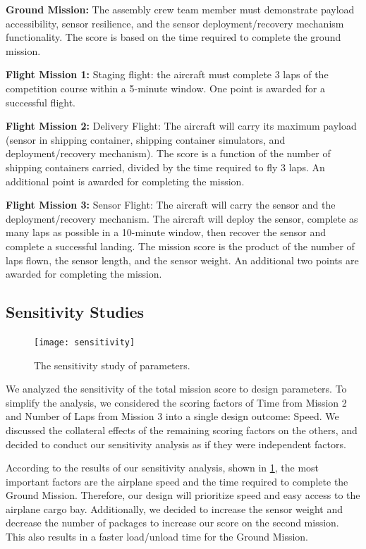 \documentclass[proposal]{byu-aero}
\begin{document}
\noindent \textbf{Ground Mission:} The assembly crew team member must demonstrate payload accessibility, sensor resilience, and the sensor deployment/recovery mechanism functionality. The score is based on the time required to complete the ground mission. 

\noindent \textbf{Flight Mission 1:} Staging flight: the aircraft must complete 3 laps of the competition course within a 5-minute window. One point is awarded for a successful flight. 

\noindent \textbf{Flight Mission 2:} Delivery Flight: The aircraft will carry its maximum payload (sensor in shipping container, shipping container simulators, and deployment/recovery mechanism). The score is a function of the number of shipping containers carried, divided by the time required to fly 3 laps. An additional point is awarded for completing the mission. 

\noindent \textbf{Flight Mission 3:} Sensor Flight: The aircraft will carry the sensor and the deployment/recovery mechanism. The aircraft will deploy the sensor, complete as many laps as possible in a 10-minute window, then recover the sensor and complete a successful landing. The mission score is the product of the number of laps flown, the sensor length, and the sensor weight. An additional two points are awarded for completing the mission.

\subsection{Sensitivity Studies}
\label{ssec:sensitivitystudies}

\begin{figure}
	\centering
	\vspace*{-10pt}
	\texttt{[image: sensitivity]}
	\caption{The sensitivity study of parameters.}
	\label{fig:Sensitivity Analysis}
\end{figure}
We analyzed the sensitivity of the total mission score to design parameters. To simplify the analysis, we considered the scoring factors of Time from Mission 2 and Number of Laps from Mission 3 into a single design outcome: Speed. We discussed the collateral effects of the remaining scoring factors on the others, and decided to conduct our sensitivity analysis as if they were independent factors.

According to the results of our sensitivity analysis, shown in \cref{fig:Sensitivity Analysis}, the most important factors are the airplane speed and the time required to complete the Ground Mission. Therefore, our design will prioritize speed and easy access to the airplane cargo bay. Additionally, we decided to increase the sensor weight and decrease the number of packages to increase our score on the second mission. This also results in a faster load/unload time for the Ground Mission.
\end{document}

